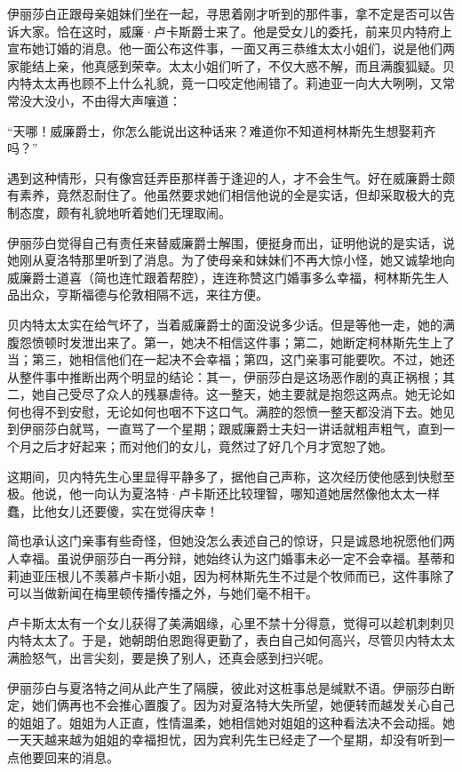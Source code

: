 \par 伊丽莎白正跟母亲姐妹们坐在一起，寻思着刚才听到的那件事，拿不定是否可以告诉大家。恰在这时，威廉·卢卡斯爵士来了。他是受女儿的委托，前来贝内特府上宣布她订婚的消息。他一面公布这件事，一面又再三恭维太太小姐们，说是他们两家能结上亲，他真感到荣幸。太太小姐们听了，不仅大惑不解，而且满腹狐疑。贝内特太太再也顾不上什么礼貌，竟一口咬定他闹错了。莉迪亚一向大大咧咧，又常常没大没小，不由得大声嚷道：
\par “天哪！威廉爵士，你怎么能说出这种话来？难道你不知道柯林斯先生想娶莉齐吗？”
\par 遇到这种情形，只有像宫廷弄臣那样善于逢迎的人，才不会生气。好在威廉爵士颇有素养，竟然忍耐住了。他虽然要求她们相信他说的全是实话，但却采取极大的克制态度，颇有礼貌地听着她们无理取闹。
\par 伊丽莎白觉得自己有责任来替威廉爵士解围，便挺身而出，证明他说的是实话，说她刚从夏洛特那里听到了消息。为了使母亲和妹妹们不再大惊小怪，她又诚挚地向威廉爵士道喜（简也连忙跟着帮腔），连连称赞这门婚事多么幸福，柯林斯先生人品出众，亨斯福德与伦敦相隔不远，来往方便。
\par 贝内特太太实在给气坏了，当着威廉爵士的面没说多少话。但是等他一走，她的满腹怨愤顿时发泄出来了。第一，她决不相信这件事；第二，她断定柯林斯先生上了当；第三，她相信他们在一起决不会幸福；第四，这门亲事可能要吹。不过，她还从整件事中推断出两个明显的结论：其一，伊丽莎白是这场恶作剧的真正祸根；其二，她自己受尽了众人的残暴虐待。这一整天，她主要就是抱怨这两点。她无论如何也得不到安慰，无论如何也咽不下这口气。满腔的怨愤一整天都没消下去。她见到伊丽莎白就骂，一直骂了一个星期；跟威廉爵士夫妇一讲话就粗声粗气，直到一个月之后才好起来；而对他们的女儿，竟然过了好几个月才宽恕了她。
\par 这期间，贝内特先生心里显得平静多了，据他自己声称，这次经历使他感到快慰至极。他说，他一向认为夏洛特·卢卡斯还比较理智，哪知道她居然像他太太一样蠢，比他女儿还要傻，实在觉得庆幸！
\par 简也承认这门亲事有些奇怪，但她没怎么表述自己的惊讶，只是诚恳地祝愿他们两人幸福。虽说伊丽莎白一再分辩，她始终认为这门婚事未必一定不会幸福。基蒂和莉迪亚压根儿不羡慕卢卡斯小姐，因为柯林斯先生不过是个牧师而已，这件事除了可以当做新闻在梅里顿传播传播之外，与她们毫不相干。
\par 卢卡斯太太有一个女儿获得了美满姻缘，心里不禁十分得意，觉得可以趁机刺刺贝内特太太了。于是，她朝朗伯恩跑得更勤了，表白自己如何高兴，尽管贝内特太太满脸怒气，出言尖刻，要是换了别人，还真会感到扫兴呢。
\par 伊丽莎白与夏洛特之间从此产生了隔膜，彼此对这桩事总是缄默不语。伊丽莎白断定，她们俩再也不会推心置腹了。因为对夏洛特大失所望，她便转而越发关心自己的姐姐了。姐姐为人正直，性情温柔，她相信她对姐姐的这种看法决不会动摇。她一天天越来越为姐姐的幸福担忧，因为宾利先生已经走了一个星期，却没有听到一点他要回来的消息。
